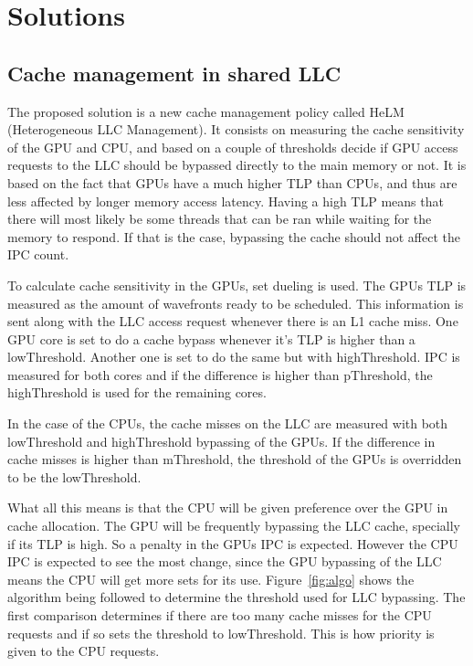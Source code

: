\documentclass[journal]{IEEEtran}
\begin{document}
\section{Solutions}
\subsection{Cache management in shared LLC}
The proposed solution is a new cache management policy called HeLM (Heterogeneous LLC Management). It consists on measuring the cache sensitivity of the GPU and CPU, and based on a couple of thresholds decide if GPU access requests to the LLC should be bypassed directly to the main memory or not.
It is based on the fact that GPUs have a much higher TLP than CPUs, and thus are less affected by longer memory access latency. Having a high TLP means that there will most likely be some threads that can be ran while waiting for the memory to respond. If that is the case, bypassing the cache should not affect the IPC count.

To calculate cache sensitivity in the GPUs, set dueling is used. The GPUs TLP is measured as the amount of wavefronts ready to be scheduled. This information is sent along with the LLC access request whenever there is an L1 cache miss. One GPU core is set to do a cache bypass whenever it's TLP is higher than a lowThreshold. Another one is set to do the same but with highThreshold. IPC is measured for both cores and if the difference is higher than pThreshold, the highThreshold is used for the remaining cores.

In the case of the CPUs, the cache misses on the LLC are measured with both lowThreshold and highThreshold bypassing of the GPUs. If the difference in cache misses is higher than mThreshold, the threshold of the GPUs is overridden to be the lowThreshold.

What all this means is that the CPU will be given preference over the GPU in cache allocation. The GPU will be frequently bypassing the LLC cache, specially if its TLP is high. So a penalty in the GPUs IPC is expected. However the CPU IPC is expected to see the most change, since the GPU bypassing of the LLC means the CPU will get more sets for its use. Figure~\ref{fig:algo} shows the algorithm being followed to determine the threshold used for LLC bypassing. The first comparison determines if there are too many cache misses for the CPU requests and if so sets the threshold to lowThreshold. This is how priority is given to the CPU requests.
\end{document}
